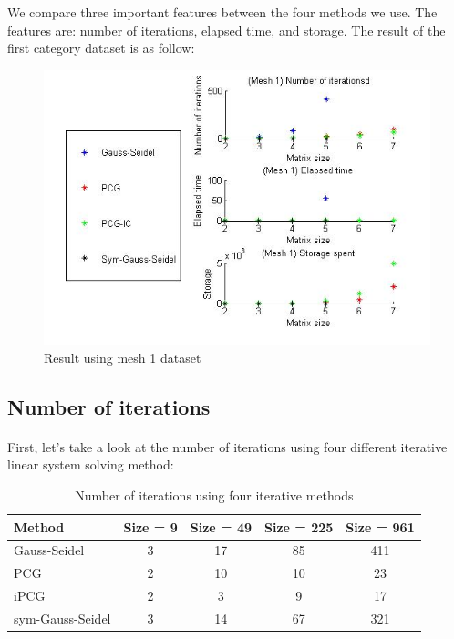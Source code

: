 \documentclass{article}
\begin{document}
We compare three important features between the four methods we use. The features are: number of iterations, elapsed time, and storage. The result of the first category dataset is as follow:
\begin{figure}[ht!]
\centering
\includegraphics[width=120mm]{mesh1result.jpg}
\caption{Result using mesh 1 dataset}
\label{overflow}
\end{figure}


\subsection{Number of iterations} 
\paragraph{}
First, let's take a look at the number of iterations using four different iterative linear system solving method:
\begin{table}[h]
\begin{center}
\begin{tabular}{lcccc}
\hline
Method & Size = 9 & Size = 49 & Size = 225 & Size = 961\\
\hline
Gauss-Seidel & 3 & 17 & 85 & 411\\
PCG & 2 & 10 & 10 & 23\\
iPCG & 2 & 3 & 9 & 17\\
sym-Gauss-Seidel & 3 & 14 & 67 & 321\\
\hline
\end{tabular}
\caption{Number of iterations using four iterative methods}
\end{center}
\end{table}
\end{document}
